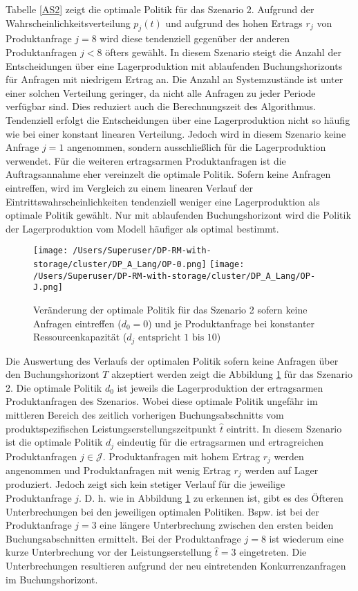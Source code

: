 Tabelle \ref{AS2} zeigt die optimale Politik für das Szenario 2. Aufgrund der Wahrscheinlichkeitsverteilung $p_j(t)$ und aufgrund des hohen Ertrags $r_j$ von Produktanfrage $j=8$ wird diese tendenziell gegenüber der anderen Produktanfragen $j<8$ öfters gewählt. In diesem Szenario steigt die Anzahl der Entscheidungen über eine Lagerproduktion mit ablaufenden Buchungshorizonts für Anfragen mit niedrigem Ertrag an. Die Anzahl an Systemzustände ist unter einer solchen Verteilung geringer, da nicht alle Anfragen zu jeder Periode verfügbar sind. Dies reduziert auch die Berechnungszeit des Algorithmus. Tendenziell erfolgt die Entscheidungen über eine Lagerproduktion nicht so häufig wie bei einer konstant linearen Verteilung. Jedoch wird in diesem Szenario keine Anfrage $j=1$ angenommen, sondern ausschließlich für die Lagerproduktion verwendet. Für die weiteren ertragsarmen Produktanfragen ist die Auftragsannahme eher vereinzelt die optimale Politik. Sofern keine Anfragen eintreffen, wird im Vergleich zu einem linearen Verlauf der Eintrittswahrscheinlichkeiten tendenziell weniger eine Lagerproduktion als optimale Politik gewählt. Nur mit ablaufenden Buchungshorizont wird die Politik der Lagerproduktion vom Modell häufiger als optimal bestimmt.

\begin{figure}[h!]     
\begin{center}
\texttt{[image: /Users/Superuser/DP-RM-with-storage/cluster/DP\_A\_Lang/OP-0.png]}
\texttt{[image: /Users/Superuser/DP-RM-with-storage/cluster/DP\_A\_Lang/OP-J.png]}
    \caption{Veränderung der optimale Politik für das Szenario 2 sofern keine Anfragen eintreffen ($d_0=0$) und je Produktanfrage bei konstanter Ressourcenkapazität ($d_j\text{ entspricht }1\text{ bis }10$)}  \label{SV2}
  \end{center}
\end{figure}

Die Auswertung des Verlaufs der optimalen Politik sofern keine Anfragen über den Buchungshorizont $T$ akzeptiert werden zeigt die Abbildung \ref{SV2} für das Szenario 2. Die optimale Politik $d_0$ ist jeweils die Lagerproduktion der ertragsarmen Produktanfragen des Szenarios. Wobei diese optimale Politik ungefähr im mittleren Bereich des zeitlich vorherigen Buchungsabschnitts vom produktspezifischen Leistungserstellungszeitpunkt $\hat t$ eintritt. In diesem Szenario ist die optimale Politik $d_j$ eindeutig für die ertragsarmen und ertragreichen Produktanfragen $j\in\mathcal{J}$. Produktanfragen mit hohem Ertrag $r_j$ werden angenommen und Produktanfragen mit wenig Ertrag $r_j$ werden auf Lager produziert. Jedoch zeigt sich kein stetiger Verlauf für die jeweilige Produktanfrage $j$. D. h. wie in Abbildung \ref{SV2} zu erkennen ist, gibt es des Öfteren Unterbrechungen bei den jeweiligen optimalen Politiken. Bspw. ist bei der Produktanfrage $j=3$ eine längere Unterbrechung zwischen den ersten beiden Buchungsabschnitten ermittelt. Bei der Produktanfrage $j=8$ ist wiederum eine kurze Unterbrechung vor der Leistungserstellung $\hat t = 3$ eingetreten. Die Unterbrechungen resultieren aufgrund der neu eintretenden Konkurrenzanfragen im Buchungshorizont.\\[.5cm]

